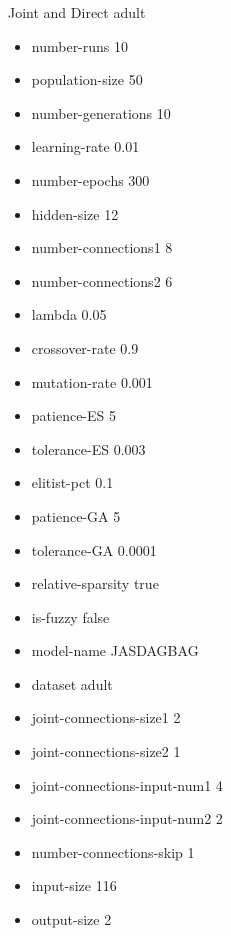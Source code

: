 Joint and Direct
adult
\begin{itemize}
\item number-runs 10
\item population-size 50
\item number-generations 10
\item learning-rate 0.01
\item number-epochs 300
\item hidden-size 12
\item number-connections1 8
\item number-connections2 6
\item lambda 0.05
\item crossover-rate 0.9
\item mutation-rate 0.001
\item patience-ES 5
\item tolerance-ES 0.003
\item elitist-pct 0.1
\item patience-GA 5
\item tolerance-GA 0.0001
\item relative-sparsity true
\item is-fuzzy false
\item model-name JASDAGBAG
\item dataset adult
\item joint-connections-size1 2
\item joint-connections-size2 1
\item joint-connections-input-num1 4
\item joint-connections-input-num2 2
\item number-connections-skip 1
\item input-size 116
\item output-size 2
\end{itemize}

